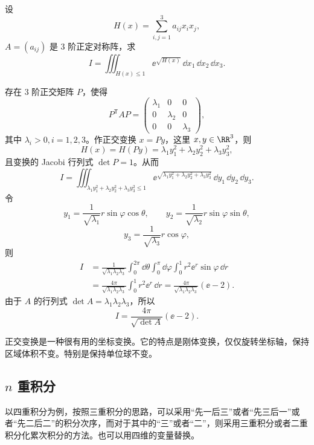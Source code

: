 \begin{xexample}[22.3.4]
设
\[
  H(x)=\sum_{i,j=1}^3a_{ij}x_ix_j,
\]
$A=(a_{ij})$ 是 3 阶正定对称阵，求
\[
  I=\iiint_{H(x)\le1}\ee^{\sqrt{H(x)}}\,\dd x_1\,\dd x_2\,\dd x_3.
\]
\end{xexample}
\begin{xsolution}
存在 3 阶正交矩阵 $P$，使得
\[
  P^{\mathsf T}AP=
  \begin{pmatrix}
    \lambda_1&0&0\\
    0&\lambda_2&0\\
    0&0&\lambda_3
  \end{pmatrix},
\]
其中 $\lambda_i>0,i=1,2,3$。作正交变换 $x=Py$，这里 $x,y\in\RR^3$，则
\[
  H(x)=H(Py)=\lambda_1y_1^2+\lambda_2y_2^2+\lambda_3y_3^2,
\]
且变换的 Jacobi 行列式 $\det P=1$。从而
\[
  I=\iiint_{\lambda_1y_1^2+\lambda_2y_2^2+\lambda_3y_3^2\le1}
  \ee^{\sqrt{\lambda_1y_1^2+\lambda_2y_2^2+\lambda_3y_3^2}}\,\dd y_1\,\dd y_2\,\dd y_3.
\]
令
\[
  y_1=\frac1{\sqrt{\lambda_1}}r\sin\varphi\cos\theta,\qquad
  y_2=\frac1{\sqrt{\lambda_2}}r\sin\varphi\sin\theta,
\]
\[
  y_3=\frac1{\sqrt{\lambda_3}}r\cos\varphi,
\]
则
\begin{align*}
  I&=\frac1{\sqrt{\lambda_1\lambda_2\lambda_3}}
  \int_0^{2\pi}\dd\theta\int_0^\pi\dd\varphi\int_0^1r^2\ee^r\sin\varphi\,\dd r\\
  &=\frac{4\pi}{\sqrt{\lambda_1\lambda_2\lambda_3}}\int_0^1r^2\ee^r\,\dd r
  =\frac{4\pi}{\sqrt{\lambda_1\lambda_2\lambda_3}}(\ee-2).
\end{align*}
由于 $A$ 的行列式 $\det A=\lambda_1\lambda_2\lambda_3$，所以
\[
  I=\frac{4\pi}{\sqrt{\det A}}(\ee-2).
\]
\end{xsolution}

\begin{xremark}
正交变换是一种很有用的坐标变换。它的特点是刚体变换，仅仅旋转坐标轴，保持区域体积不变。特别是保持单位球不变。
\end{xremark}

\subsection{\texorpdfstring{$n$ 重积分}{n 重积分}}

以四重积分为例，按照三重积分的思路，可以采用“先一后三”或者“先三后一”或者“先二后二”的积分次序，而对于其中的“三”或者“二”，则采用三重积分或者二重积分化累次积分的方法。也可以用四维的变量替换。

